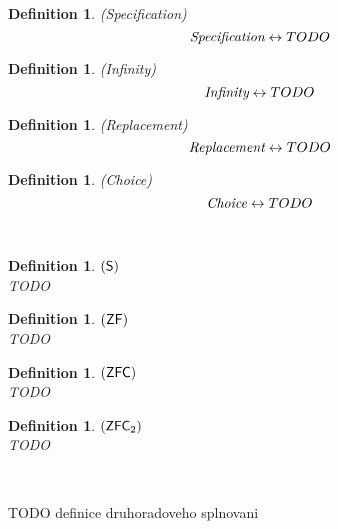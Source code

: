 \documentclass[12pt,a4paper]{article}
\newtheorem{definition}[theorem]{Definition}
\renewcommand{\iff}{\leftrightarrow}
\begin{document}
\begin{definition}{(\emph{Specification})}\label{def:specification}\\
\begin{equation}
\emph{Specification} \iff TODO
\end{equation}
\end{definition}

\begin{definition}{(\emph{Infinity})}\label{def:infinity}\\
\begin{equation}
\emph{Infinity} \iff TODO
\end{equation}
\end{definition}

\begin{definition}{(\emph{Replacement})}\label{def:replacement}\\
\begin{equation}
\emph{Replacement} \iff TODO
\end{equation}
\end{definition}

\begin{definition}{(\emph{Choice})}\label{def:choice}\\
\begin{equation}
\emph{Choice} \iff TODO
\end{equation}
\end{definition}

\

\begin{definition}{$(\sf{S})$}\label{def:s}\\
TODO
\end{definition}

\begin{definition}{$(\sf{ZF})$}\label{def:zf}\\
TODO
\end{definition}

\begin{definition}{$(\sf{ZFC})$}\label{def:zfc}\\
TODO
\end{definition}

\begin{definition}{$(\sf{ZFC\textsubscript{2}})$}\label{def:zfc_2}\\
TODO
\end{definition}

\

TODO definice druhoradoveho splnovani
\end{document}
